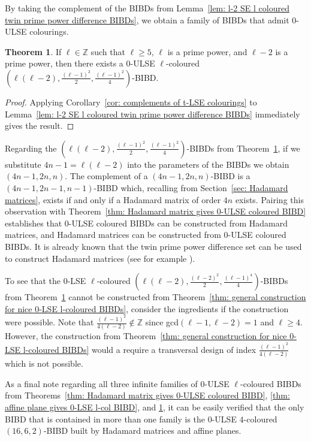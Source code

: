 \documentclass[12pt]{article}
\theoremstyle{definition}
\newtheorem{theorem}{Theorem}[section]
\begin{document}
By taking the complement of the BIBDs from Lemma~\ref{lem: l-2 SE l coloured twin prime power difference BIBDs}, we obtain a family of BIBDs that admit $0$-ULSE colourings.

\begin{theorem}\label{thm: twin prime powers give 0-ULSE BIBD}
    If $\ell\in \mathbb{Z}$ such that $\ell \geq 5$, $\ell$ is a prime power, and $\ell - 2$ is a prime power, then there exists a $0$-ULSE $\ell$-coloured $\left(\ell(\ell - 2), \frac{(\ell - 1)^2}{2}, \frac{(\ell - 1)^2}{4}\right)$-BIBD.
\end{theorem}

\begin{proof}
    Applying Corollary~\ref{cor: complements of t-LSE colourings} to Lemma~\ref{lem: l-2 SE l coloured twin prime power difference BIBDs} immediately gives the result. 
\end{proof}

Regarding the $\left(\ell(\ell - 2), \frac{(\ell - 1)^2}{2}, \frac{(\ell - 1)^2}{4}\right)$-BIBDs from Theorem~\ref{thm: twin prime powers give 0-ULSE BIBD}, if we substitute $4n-1 = \ell(\ell-2)$ into the parameters of the BIBDs we obtain $(4n-1, 2n, n)$. The complement of a $(4n-1, 2n, n)$-BIBD is a $(4n-1, 2n-1, n-1)$-BIBD which, recalling from Section~\ref{sec: Hadamard matrices}, exists if and only if a Hadamard matrix of order $4n$ exists. Pairing this observation with Theorem~\ref{thm: Hadamard matrix gives 0-ULSE coloured BIBD} establishes that $0$-ULSE coloured BIBDs can be constructed from Hadamard matrices, and Hadamard matrices can be constructed from $0$-ULSE coloured BIBDs. It is already known that the twin prime power difference set can be used to construct Hadamard matrices (see for example \cite{OCS10}).

To see that the $0$-LSE $\ell$-coloured $\left(\ell(\ell-2), \frac{(\ell-2)^2}{2}, \frac{(\ell-1)^4}{4}\right)$-BIBDs from Theorem~\ref{thm: twin prime powers give 0-ULSE BIBD} cannot be constructed from Theorem~\ref{thm: general construction for nice 0-LSE l-coloured BIBDs}, consider the ingredients if the construction were possible. Note that $\frac{(\ell-1)^2}{4(\ell-2)}\notin \mathbb{Z}$ since gcd$(\ell-1, \ell-2) = 1$ and $\ell \geq 4$. However, the construction from Theorem~\ref{thm: general construction for nice 0-LSE l-coloured BIBDs} would a require a transversal design of index $\frac{(\ell-1)^2}{4(\ell-2)}$ which is not possible.

As a final note regarding all three infinite families of $0$-ULSE $\ell$-coloured BIBDs from Theorems~\ref{thm: Hadamard matrix gives 0-ULSE coloured BIBD}, \ref{thm: affine plane gives 0-LSE l-col BIBD}, and \ref{thm: twin prime powers give 0-ULSE BIBD}, it can be easily verified that the only BIBD that is contained in more than one family is the $0$-ULSE $4$-coloured $(16,6,2)$-BIBD built by Hadamard matrices and affine planes. 
\end{document}
